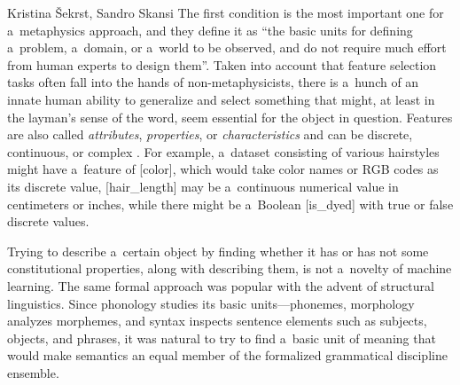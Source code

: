 \begin{artengenv2auth}{Kristina Šekrst, Sandro Skansi}
The first condition is the most important one for a~metaphysics approach, and they define it as ``the basic units for defining a~problem, a~domain, or a~world to be observed, and do not require much effort from human experts to design them''. Taken into account that feature selection tasks often fall into the hands of non-metaphysicists, there is a~hunch of an innate human ability to generalize and select something that might, at least in the layman's sense of the word, seem essential for the object in question. Features are also called \textit{attributes}, \textit{properties}, or \textit{characteristics} and can be discrete, continuous, or complex
\parencite[][p.3]{liu_feature_1998}. %
 For example, a~dataset consisting of various hairstyles might have a~feature of [color], which would take color names or RGB codes as its discrete value, [hair\_length] may be a~continuous numerical value in centimeters or inches, while there might be a~Boolean [is\_dyed] with true or false discrete values.

Trying to describe a~certain object by finding whether it has or has not some constitutional properties, along with describing them, is not a~novelty of machine learning. The same formal approach was popular with the advent of structural linguistics. Since phonology studies its basic units—phonemes, morphology analyzes morphemes, and syntax inspects sentence elements such as subjects, objects, and phrases, it was natural to try to find a~basic unit of meaning that would make semantics an equal member of the formalized grammatical discipline ensemble.


\end{artengenv2auth}

